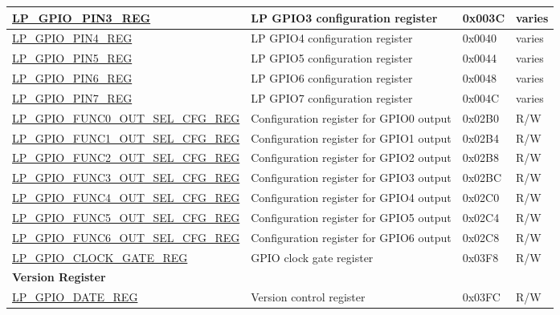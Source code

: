 \begin{longtable}{ | p{5.7cm} | p{7cm} | p{1.3cm} | p{1.9cm} | }
\hyperref[regdesc:LPGPIOPINNREG]{LP\_GPIO\_PIN3\_REG} & LP GPIO3 configuration register & 0x003C & varies \\ \hline
\hyperref[regdesc:LPGPIOPINNREG]{LP\_GPIO\_PIN4\_REG} & LP GPIO4 configuration register & 0x0040 & varies \\ \hline
\hyperref[regdesc:LPGPIOPINNREG]{LP\_GPIO\_PIN5\_REG} & LP GPIO5 configuration register & 0x0044 & varies \\ \hline
\hyperref[regdesc:LPGPIOPINNREG]{LP\_GPIO\_PIN6\_REG} & LP GPIO6 configuration register & 0x0048 & varies \\ \hline
\hyperref[regdesc:LPGPIOPINNREG]{LP\_GPIO\_PIN7\_REG} & LP GPIO7 configuration register & 0x004C & varies \\ \hline
\hyperref[regdesc:LPGPIOFUNCNOUTSELCFGREG]{LP\_GPIO\_FUNC0\_OUT\_SEL\_CFG\_REG} & Configuration register for GPIO0 output & 0x02B0 & R/W \\ \hline
\hyperref[regdesc:LPGPIOFUNCNOUTSELCFGREG]{LP\_GPIO\_FUNC1\_OUT\_SEL\_CFG\_REG} & Configuration register for GPIO1 output & 0x02B4 & R/W \\ \hline
\hyperref[regdesc:LPGPIOFUNCNOUTSELCFGREG]{LP\_GPIO\_FUNC2\_OUT\_SEL\_CFG\_REG} & Configuration register for GPIO2 output & 0x02B8 & R/W \\ \hline
\hyperref[regdesc:LPGPIOFUNCNOUTSELCFGREG]{LP\_GPIO\_FUNC3\_OUT\_SEL\_CFG\_REG} & Configuration register for GPIO3 output & 0x02BC & R/W \\ \hline
\hyperref[regdesc:LPGPIOFUNCNOUTSELCFGREG]{LP\_GPIO\_FUNC4\_OUT\_SEL\_CFG\_REG} & Configuration register for GPIO4 output & 0x02C0 & R/W \\ \hline
\hyperref[regdesc:LPGPIOFUNCNOUTSELCFGREG]{LP\_GPIO\_FUNC5\_OUT\_SEL\_CFG\_REG} & Configuration register for GPIO5 output & 0x02C4 & R/W \\ \hline
\hyperref[regdesc:LPGPIOFUNCNOUTSELCFGREG]{LP\_GPIO\_FUNC6\_OUT\_SEL\_CFG\_REG} & Configuration register for GPIO6 output & 0x02C8 & R/W \\ \hline
\hyperref[regdesc:LPGPIOCLOCKGATEREG]{LP\_GPIO\_CLOCK\_GATE\_REG} & GPIO clock gate register & 0x03F8 & R/W \\ \hline
\multicolumn{4}{|l|}{\textbf{Version Register}} \\ \hline
\hyperref[regdesc:LPGPIODATEREG]{LP\_GPIO\_DATE\_REG} & Version control register & 0x03FC & R/W \\ \hline
\end{longtable}
